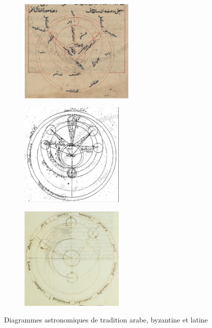 	\begin{figure}[h]
		\begin{subfigure}{0.34\linewidth}
			\centering
			\includegraphics[width=5.5cm]{images/modele_lune_arabe.png}
		\end{subfigure}
		\hspace{1pt}
		\begin{subfigure}{0.30\linewidth}
			\centering
			\includegraphics[width=5cm]{images/modele_lune_byz.png}
		\end{subfigure}
  		\hspace{1pt}
  		\begin{subfigure}{0.30\linewidth}
			\centering
			\includegraphics[width=5cm]{images/modele_lune_latin.png}
		\end{subfigure}
		\caption{Diagrammes astronomiques de tradition arabe, byzantine et latine}
		\label{fig:modeles_lune}
	\end{figure}
 
